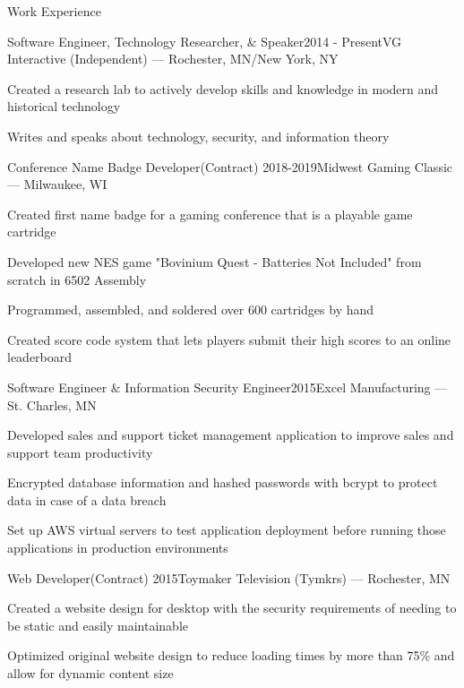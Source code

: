 \documentclass{resume} %
\begin{document}
\begin{rSection}{Work Experience}

\begin{rSubsection}{Software Engineer, Technology Researcher, \& Speaker}{2014 - Present}{VG Interactive (Independent) --- Rochester, MN/New York, NY}{}
\item Created a research lab to actively develop skills and knowledge in modern and historical technology
\item Writes and speaks about technology, security, and information theory
\end{rSubsection}

\begin{rSubsection}{Conference Name Badge Developer}{(Contract) 2018-2019}{Midwest Gaming Classic --- Milwaukee, WI}{}
\item Created first name badge for a gaming conference that is a playable game cartridge
\item Developed new NES game "Bovinium Quest - Batteries Not Included" from scratch in 6502 Assembly
\item Programmed, assembled, and soldered over 600 cartridges by hand
\item Created score code system that lets players submit their high scores to an online leaderboard
\end{rSubsection}

\begin{rSubsection}{Software Engineer \& Information Security Engineer}{2015}{Excel Manufacturing --- St. Charles, MN}{}
\item Developed sales and support ticket management application to improve sales and support team productivity
\item Encrypted database information and hashed passwords with bcrypt to protect data in case of a data breach
\item Set up AWS virtual servers to test application deployment before running those applications in production environments
\end{rSubsection}

\begin{rSubsection}{Web Developer}{(Contract) 2015}{Toymaker Television (Tymkrs) --- Rochester, MN}{}
\item Created a website design for desktop with the security requirements of needing to be static and easily maintainable
\item Optimized original website design to reduce loading times by more than 75\% and allow for dynamic content size
\end{rSubsection}


\end{rSection}
\end{document}
